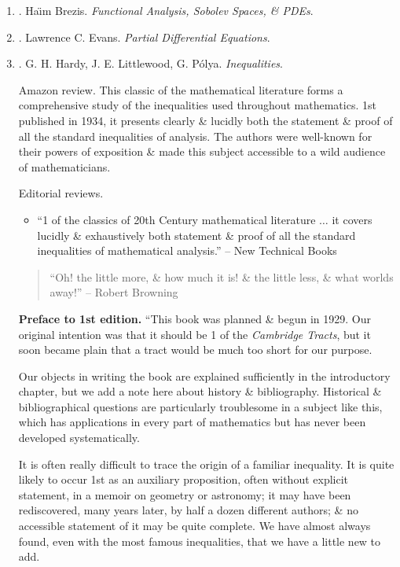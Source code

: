 \documentclass{article}
\begin{document}
\begin{enumerate}
	\item \cite{Brezis2011}. {\sc Ha\"\i m Brezis}. {\it Functional Analysis, Sobolev Spaces, \& PDEs}.\hfill{\sf[reading]}

	\item \cite{Evans2010}. {\sc Lawrence C. Evans}. {\it Partial Differential Equations}.\hfill{\sf[reading]}

	\item \cite{Hardy_Littlewood_Polya1952}. {\sc G. H. Hardy, J. E. Littlewood, G. P\'{o}lya}. {\it Inequalities}. {}

	{\sf Amazon review.} This classic of the mathematical literature forms a comprehensive study of the inequalities used throughout mathematics. 1st published in 1934, it presents clearly \& lucidly both the statement \& proof of all the standard inequalities of analysis. The authors were well-known for their powers of exposition \& made this subject accessible to a wild audience of mathematicians.

	{\sf Editorial reviews.}
	\begin{itemize}
		\item ``1 of the classics of 20th Century mathematical literature $\ldots$ it covers lucidly \& exhaustively both statement \& proof of all the standard inequalities of mathematical analysis.'' -- New Technical Books
	\end{itemize}
	\begin{quote}
		``Oh! the little more, \& how much it is! \& the little less, \& what worlds away!'' -- {\sc Robert Browning}
	\end{quote}
	{\bf Preface to 1st edition.} ``This book was planned \& begun in 1929. Our original intention was that it should be 1 of the {\it Cambridge Tracts}, but it soon became plain that a tract would be much too short for our purpose.

	Our objects in writing the book are explained sufficiently in the introductory chapter, but we add a note here about history \& bibliography. Historical \& bibliographical questions are particularly troublesome in a subject like this, which has applications in every part of mathematics but has never been developed systematically.

	It is often really difficult to trace the origin of a familiar inequality. It is quite likely to occur 1st as an auxiliary proposition, often without explicit statement, in a memoir on geometry or astronomy; it may have been rediscovered, many years later, by half a dozen different authors; \& no accessible statement of it may be quite complete. We have almost always found, even with the most famous inequalities, that we have a little new to add.


\end{enumerate}
\end{document}
